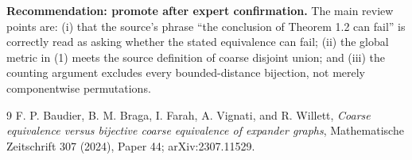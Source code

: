 \documentclass[11pt]{article}
\begin{document}
\textbf{Recommendation: promote after expert confirmation.}  The main review
points are: (i) that the source's phrase ``the conclusion of Theorem 1.2 can
fail'' is correctly read as asking whether the stated equivalence can fail;
(ii) the global metric in (1) meets the source definition of coarse disjoint
union; and (iii) the counting argument excludes every bounded-distance
bijection, not merely componentwise permutations.

\begin{thebibliography}{9}
F. P. Baudier, B. M. Braga, I. Farah, A. Vignati, and R. Willett,
\emph{Coarse equivalence versus bijective coarse equivalence of expander
graphs}, Mathematische Zeitschrift 307 (2024), Paper 44;
arXiv:2307.11529.
\end{thebibliography}
\end{document}
